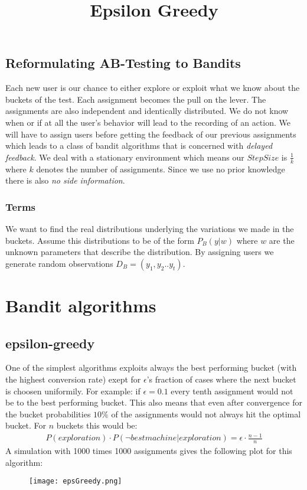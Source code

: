 \documentclass[main.tex]{subfiles}
\begin{document}
\subsection{Reformulating AB-Testing to Bandits}
Each new user is our chance to either explore or exploit what we know about the buckets of the test. Each assignment becomes the pull on the lever. The assignments are also independent and identically distributed. We do not know when or if at all the user's behavior will lead to the recording of an action. We will have to assign users before getting the feedback of our previous assignments which leads to a class of bandit algorithms that is concerned with \emph{delayed feedback}. We deal with a stationary environment which means our $StepSize$ is $\frac{1}{k}$ where $k$ denotes the number of assignments. Since we use no prior knowledge there is also \emph{no side information}. 
\subsubsection{Terms}
We want to find the real distributions underlying the variations we made in the buckets. Assume this distributions to be of the form $P_B(y|w)$ where $w$ are the unknown parameters that describe the distribution. By assigning users we generate random observations $D_B=(y_1,y_2..y_t)$.

\section{Bandit algorithms}
\subsection{epsilon-greedy}
One of the simplest algorithms exploits always the best performing bucket (with the highest conversion rate) exept for $\epsilon $'s fraction of cases where the next bucket is choosen uniformily. For example: if $\epsilon = 0.1$ every tenth assignment would not be to the best performing bucket. This also means that even after convergence for the bucket probabilities $10\%$ of the assignments would not always hit the optimal bucket. For $n$ buckets this would be:
\begin{align*}
P(exploration) \cdot P(\neg best machine | exploration) = \epsilon \cdot \frac{n-1}{n}
\end{align*}
A simulation with 1000 times 1000 assignments gives the following plot for this algorithm:
\begin{figure}[ht]
\texttt{[image: epsGreedy.png]}
\centering
\title{Epsilon Greedy}
\end{figure}
\end{document}

